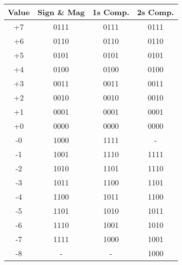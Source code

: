 \begin{tabular}{cccc}
	\toprule
	Value & Sign \& Mag & 1s Comp. & 2s Comp. \\
	\midrule
	+7    & {0111}      & {0111}   & {0111}   \\
	+6    & {0110}      & {0110}   & {0110}   \\
	+5    & {0101}      & {0101}   & {0101}   \\
	+4    & {0100}      & {0100}   & {0100}   \\
	+3    & {0011}      & {0011}   & {0011}   \\
	+2    & {0010}      & {0010}   & {0010}   \\
	+1    & {0001}      & {0001}   & {0001}   \\
	+0    & {0000}      & {0000}   & {0000}   \\
	\midrule
	-0    & {1000}      & {1111}   & {-}      \\
	-1    & {1001}      & {1110}   & {1111}   \\
	-2    & {1010}      & {1101}   & {1110}   \\
	-3    & {1011}      & {1100}   & {1101}   \\
	-4    & {1100}      & {1011}   & {1100}   \\
	-5    & {1101}      & {1010}   & {1011}   \\
	-6    & {1110}      & {1001}   & {1010}   \\
	-7    & {1111}      & {1000}   & {1001}   \\
	-8    & {-}         & {-}      & {1000}   \\
	\bottomrule
\end{tabular}
